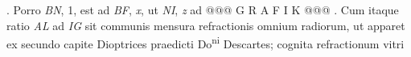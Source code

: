                     . Porro \textit{BN}, 1, est ad \textit{BF}, \textit{x}, ut \textit{NI}, \textit{z} ad @@@ G R A F I K @@@%
                    .  Cum itaque ratio \textit{AL} ad \textit{IG} sit communis mensura refractionis  omnium radiorum, ut apparet ex secundo capite Dioptrices  praedicti Do\textsuperscript{ni} Descartes\protect{}; cognita refractionum vitri 